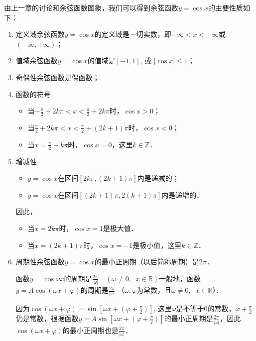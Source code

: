 由上一章的讨论和余弦函数图象，我们可以得到余弦函数$y=\cos x$的主要性质如下：
\begin{enumerate}
\item 定义域\quad  余弦函数$y=\cos x$的定义域是一切实数，即$-\infty<x<+\infty$或$(-\infty, +\infty)$；
\item 值域\quad 余弦函数$y=\cos x$的值域是$[-1, 1]$, 或
$|\cos x|\le 1$；
\item 奇偶性\quad 余弦函数是偶函数；
\item 函数的符号
\begin{itemize}
    \item 当$-\frac{\pi}{2}+2k\pi<x<\frac{\pi}{2}+2k\pi$时，$\cos x>0$；
    \item 当$\frac{\pi}{2}+2k\pi<x<\frac{\pi}{2}+(2k+1)\pi$时，$\cos x<0$；
    \item 当$x=\frac{\pi}{2}+k\pi$时，$\cos x=0$，这里$k\in\mathbb{Z}$．
\end{itemize}

\item 增减性
\begin{itemize}
    \item $y=\cos x$在区间$[2k\pi,(2k+1)\pi]$内是递减的；
    \item $y=\cos x$在区间$[(2k+1)\pi,2(k+1)\pi]$内是递增的．
\end{itemize}
因此，
\begin{itemize}
    \item 当$x=2k\pi$时，$\cos x=1$是极大值．
    \item 当$x=(2k+1)\pi$时，$\cos x=-1$是极小值，这里$k\in\mathbb{Z}$．
\end{itemize}

\item 周期性\quad 余弦函数$y=\cos x$的最小正周期（以后简称周期）是$2\pi$．

函数$y=\cos \omega x$的周期是$\frac{2\pi}{|\omega|}\quad (\omega\ne 0,\;\;x\in \mathbb{R})$一般地，函数$y=A\cos(\omega x+\varphi)$的周期是$\frac{2\pi}{|\omega|}$
（$\omega,\varphi$为常数，且$\omega\ne 0,\;\;x\in \mathbb{R}$）．

因为$\cos(\omega x+\varphi)=\sin\left[\omega x+\left(\varphi+\frac{\pi}{2}\right)\right]$, 这里$\omega$是不等于0的常数，$\varphi+\frac{\pi}{2}$仍是常数，根据函数$y=A\sin\left[\omega x+\left(\varphi+\frac{\pi}{2}\right)\right]$的最小正周期是$\frac{2\pi}{|\omega|}$，因此
$\cos(\omega x+\varphi)$的最小正周期也是$\frac{2\pi}{|\omega|}$．

\end{enumerate}

